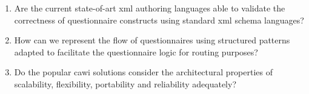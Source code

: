 	\begin{enumerate}
		\item Are the current state-of-art \gls{xml} authoring languages able to validate the correctness of questionnaire constructs using standard \gls{xml} schema languages?
		\item How can we represent the flow of questionnaires using structured patterns adapted to facilitate the questionnaire logic for routing purposes? %
		\item Do the popular \gls{cawi} solutions consider the architectural properties of scalability, flexibility, portability and reliability adequately?
	\end{enumerate}